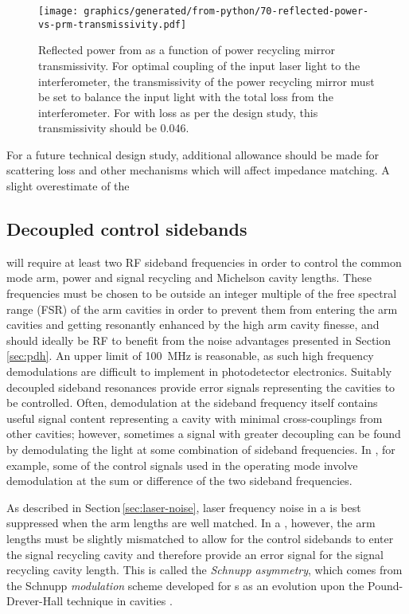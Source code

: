\begin{figure}
  \centering
  \texttt{[image: graphics/generated/from-python/70-reflected-power-vs-prm-transmissivity.pdf]}
  \caption[Reflected power from \ETLF{} as a function of power recycling mirror transmissivity]{\label{fig:reflected-power-vs-prm-trans}Reflected power from \ETLF{} as a function of power recycling mirror transmissivity. For optimal coupling of the input laser light to the interferometer, the transmissivity of the power recycling mirror must be set to balance the input light with the total loss from the interferometer. For \ETLF{} with loss as per the design study, this transmissivity should be \num{0.046}.}
\end{figure}

For a future technical design study, additional allowance should be made for scattering loss and other mechanisms which will affect impedance matching. A slight overestimate of the 

\subsection{\label{sec:decoupled-sidebands}Decoupled control sidebands}
\ETLF{} will require at least two \gls{RF} sideband frequencies in order to control the common mode arm, power and signal recycling and Michelson cavity lengths. These frequencies must be chosen to be outside an integer multiple of the free spectral range (\gls{FSR}) of the arm cavities in order to prevent them from entering the arm cavities and getting resonantly enhanced by the high arm cavity finesse, and should ideally be \gls{RF} to benefit from the noise advantages presented in Section\,\ref{sec:pdh}. An upper limit of \SI{100}{\mega\hertz} is reasonable, as such high frequency demodulations are difficult to implement in photodetector electronics. Suitably decoupled sideband resonances provide error signals representing the cavities to be controlled. Often, demodulation at the sideband frequency itself contains useful signal content representing a cavity with minimal cross-couplings from other cavities; however, sometimes a signal with greater decoupling can be found by demodulating the light at some combination of sideband frequencies. In \ALIGO{}, for example, some of the control signals used in the operating mode involve demodulation at the sum or difference of the two sideband frequencies.

As described in Section\,\ref{sec:laser-noise}, laser frequency noise in a \MI{} is best suppressed when the arm lengths are well matched. In a \DRFPMI{}, however, the arm lengths must be slightly mismatched to allow for the control sidebands to enter the signal recycling cavity and therefore provide an error signal for the signal recycling cavity length. This is called the \emph{Schnupp asymmetry}, which comes from the Schnupp \emph{modulation} scheme developed for \MI{}s as an evolution upon the Pound-Drever-Hall technique in \FP{} cavities .

